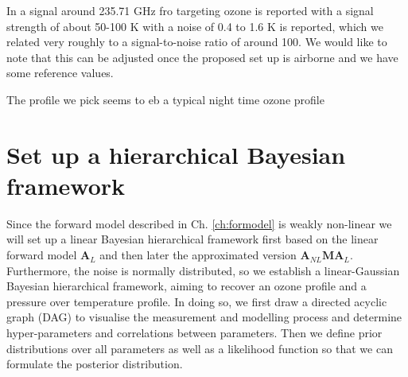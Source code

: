 In \cite[8]{Froidevaux2008snrozone} a signal around 235.71 GHz fro targeting ozone is reported with a signal strength of about 50-100 K with a noise of 0.4 to 1.6 K is reported, which we related very roughly to a signal-to-noise ratio of around 100.
We would like to note that this can be adjusted once the proposed set up is airborne and we have some reference values.



The profile we pick seems to eb a typical night time ozone profile \cite{Lee2020NightOzone}



\section{Set up a hierarchical Bayesian framework}
\label{sec:BayModel}
Since the forward model described in Ch. \ref{ch:formodel} is weakly non-linear we will set up a linear Bayesian hierarchical framework first based on the linear forward model $\bm{A}_L$ and then later the approximated version $\bm{A}_{NL}\bm{M} \bm{A}_L$.
Furthermore, the noise is normally distributed, so we establish a linear-Gaussian Bayesian hierarchical framework, aiming to recover an ozone profile and a pressure over temperature profile.
In doing so, we first draw a directed acyclic graph (DAG) to visualise the measurement and modelling process and determine hyper-parameters and correlations between parameters.
Then we define prior distributions over all parameters as well as a likelihood function so that we can formulate the posterior distribution.


